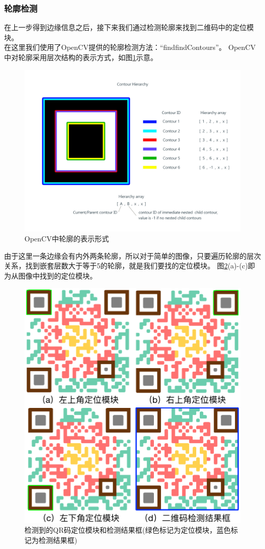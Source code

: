 \subsubsection{轮廓检测}
在上一步得到边缘信息之后，接下来我们通过检测轮廓来找到二维码中的定位模块。\\
在这里我们使用了OpenCV提供的轮廓检测方法：“findfindContours”。
OpenCV中对轮廓采用层次结构的表示方式，如图\ref{fig:contour}示意。
\begin{figure}[h]
\centering
\includegraphics[width=1\linewidth]{contour}
\caption[contour]{OpenCV中轮廓的表示形式}
\label{fig:contour}
\end{figure}
由于这里一条边缘会有内外两条轮廓，所以对于简单的图像，只要遍历轮廓的层次关系，找到嵌套层数大于等于5的轮廓，就是我们要找的定位模块。
图\ref{fig:detection}(a)-(c)即为从图像中找到的定位模块。
\begin{figure}[h]
\centering
\includegraphics[width=0.9\linewidth]{detection}
\caption[detection]{检测到的QR码定位模块和检测结果框(绿色标记为定位模块，蓝色标记为检测结果框)}
\label{fig:detection}
\end{figure}
